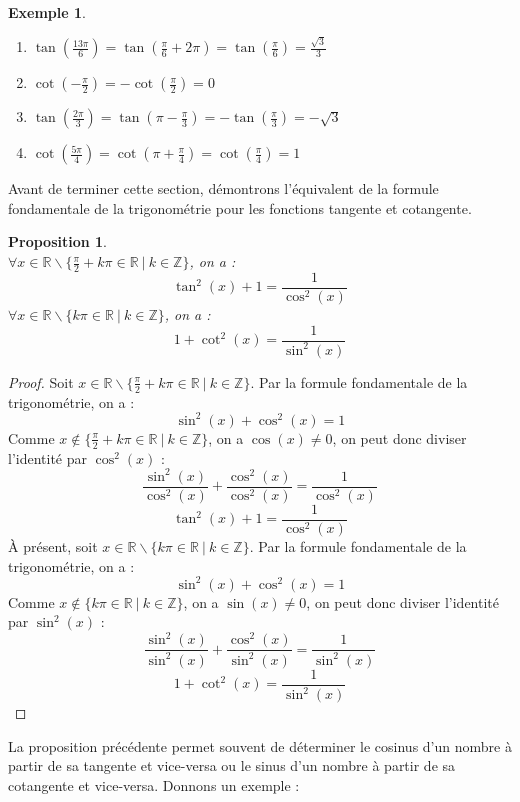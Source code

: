 \documentclass[a4paper,fontsize=13pt]{scrreprt}
\theoremstyle{plain}
\newtheorem{pro}[subsection]{Proposition}
\theoremstyle{definition}
\newtheorem{exe}[subsection]{Exemple}
\newcommand{\zz}{\mathbb{Z}}
\newcommand{\rr}{\mathbb{R}}
\begin{document}
\begin{exe}
\begin{enumerate}
\item $\tan(\frac{13\pi}{6}) = \tan(\frac{\pi}{6}+2\pi) = \tan(\frac{\pi}{6}) = \frac{\sqrt{3}}{3}$
\item $\cot(-\frac{\pi}{2}) = -\cot(\frac{\pi}{2}) = 0$
\item $\tan(\frac{2\pi}{3}) = \tan(\pi -\frac{\pi}{3}) =  -\tan(\frac{\pi}{3})=-\sqrt{3}$
\item $\cot(\frac{5\pi}{4}) = \cot(\pi +\frac{\pi}{4}) = \cot(\frac{\pi}{4})=1$
\end{enumerate}
\end{exe}
Avant de terminer cette section, démontrons l'équivalent de la  formule fondamentale de la trigonométrie pour les fonctions tangente et cotangente.
\begin{pro} \label{fftc} ~\\
$\forall x \in \rr \backslash \{\frac{\pi}{2}+k\pi \in \rr ~|~k \in \zz\}$, on a :
$$\tan^2(x) + 1 = \frac{1}{\cos^2(x)}$$
$\forall x \in \rr \backslash \{k\pi \in \rr ~|~k \in \zz\}$, on a :
$$1 + \cot^2(x) = \frac{1}{\sin^2(x)}$$
\end{pro}
\begin{proof}
Soit $x \in \rr \backslash \{\frac{\pi}{2}+k\pi \in \rr ~|~k \in \zz\}$. Par la formule fondamentale de la trigonométrie, on a :
$$\sin^2(x) + \cos^2(x)=1$$
Comme $x \notin  \{\frac{\pi}{2}+k\pi \in \rr ~|~k \in \zz\}$, on a $\cos(x) \neq 0$, on peut donc diviser l'identité par $\cos^2(x)$ :
$$\frac{\sin^2(x)}{\cos^2(x)} + \frac{\cos^2(x)}{\cos^2(x)}=\frac{1}{\cos^2(x)}$$
$$\tan^2(x) + 1 = \frac{1}{\cos^2(x)}$$
\`A présent, soit $x \in \rr \backslash \{k\pi \in \rr ~|~k \in \zz\}$. Par la formule fondamentale de la trigonométrie, on a :
$$\sin^2(x) + \cos^2(x)=1$$
Comme $x \notin  \{k\pi \in \rr ~|~k \in \zz\}$, on a $\sin(x) \neq 0$, on peut donc diviser l'identité par $\sin^2(x)$ :
$$\frac{\sin^2(x)}{\sin^2(x)} + \frac{\cos^2(x)}{\sin^2(x)}=\frac{1}{\sin^2(x)}$$
$$1 + \cot^2(x) = \frac{1}{\sin^2(x)}$$
\end{proof}
La proposition précédente permet souvent de déterminer le cosinus d'un nombre à partir de sa tangente et vice-versa ou le sinus d'un nombre à partir de sa cotangente et vice-versa. Donnons un exemple :
\end{document}
